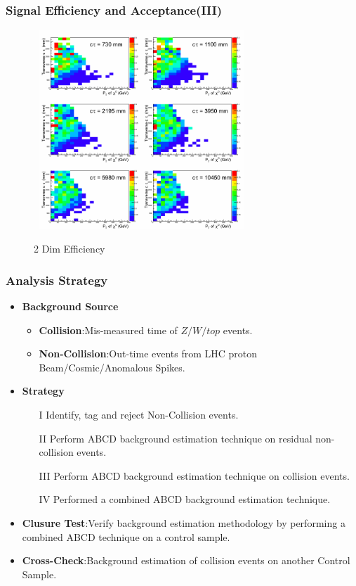 \documentclass{beamer}
\begin{document}
\begin{frame}
\frametitle{Signal Efficiency and Acceptance(III)}
  \begin{figure}[ht]
   \begin{minipage}[b]{0.7\linewidth}
    \mbox{
  \centering
  \includegraphics[height=7.5cm, width=0.65\paperwidth]{THESISPLOTS/Eff180_xPt_ct.png} }
    \vspace{-0.5cm}
    \caption{2 Dim Efficiency}
  \end{minipage}
 \end{figure}
\end{frame}

\begin{frame}
\frametitle{\Huge{Analysis Strategy}}
\begin{itemize}
 \item \textcolor{UMN@Maroon}{\textbf{Background Source}}
  \begin{itemize}
   \item \textbf{Collision}:Mis-measured time of $Z/W/top$ events.
   \item \textbf{Non-Collision}:Out-time events from LHC proton Beam/Cosmic/Anomalous Spikes.
  \end{itemize}
 \item \textcolor{UMN@Maroon}{\textbf{Strategy}}
   \begin{enumerate}
    \item[I] Identify, tag and reject Non-Collision events.
    \item[II] Perform ABCD background estimation technique on residual non-collision events.
    \item[III]Perform ABCD background estimation technique on collision events.
    \item[IV] Performed a combined ABCD background estimation technique. 
    \end{enumerate}
 \item \textcolor{UMN@Maroon}{\textbf{Clusure Test}}:Verify background estimation methodology by performing a combined ABCD technique on a control sample.
 \item \textcolor{UMN@Maroon}{\textbf{Cross-Check}}:Background estimation of collision events on another Control Sample.
\end{itemize}  
\end{frame}
\end{document}
